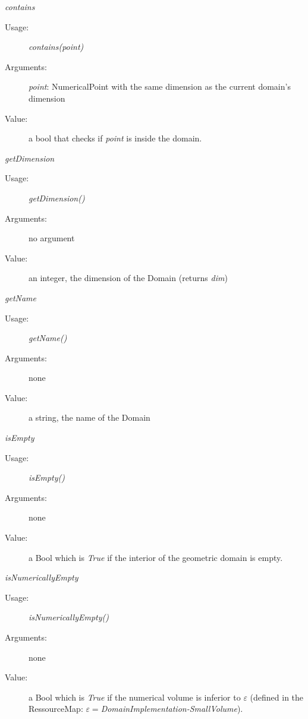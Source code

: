 \begin{description}
\begin{description}

\item \textit{contains}
\begin{description}
\item[Usage:] \textit{contains(point)}
\item[Arguments:] \textit{point}:   NumericalPoint with the same dimension as the current domain's dimension
\item[Value:]  a bool that checks if \textit{point} is inside the domain.
\end{description}
\bigskip

\item \textit{getDimension}
\begin{description}
\item[Usage:] \textit{getDimension()}
\item[Arguments:] no argument
\item[Value:]  an integer, the dimension of the Domain (returns \textit{dim})
\end{description}
\bigskip


\item \textit{getName}
\begin{description}
\item[Usage:] \textit{getName()}
\item[Arguments:] none
\item[Value:] a string, the name of the Domain
\end{description}
\bigskip

\item \textit{isEmpty}
\begin{description}
\item[Usage:] \textit{isEmpty()}
\item[Arguments:] none
\item[Value:] a Bool which is \textit{True} if the interior of the geometric domain is empty.
\end{description}
\bigskip


\item \textit{isNumericallyEmpty}
\begin{description}
\item[Usage:] \textit{isNumericallyEmpty()}
\item[Arguments:] none
\item[Value:]  a Bool which is \textit{True} if the numerical volume is inferior to $\varepsilon$ (defined in the RessourceMap: $\varepsilon=$\textit{DomainImplementation-SmallVolume}).
\end{description}
\bigskip


\end{description}
\end{description}
